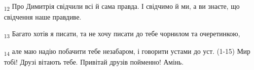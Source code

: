 \begin{tcolorbox}
\textsubscript{12} Про Димитрія свідчили всі й сама правда. І свідчимо й ми, а ви знаєте, що свідчення наше правдиве.
\end{tcolorbox}
\begin{tcolorbox}
\textsubscript{13} Багато хотів я писати, та не хочу писати до тебе чорнилом та очеретинкою,
\end{tcolorbox}
\begin{tcolorbox}
\textsubscript{14} але маю надію побачити тебе незабаром, і говорити устами до уст. (1-15) Мир тобі! Друзі вітають тебе. Привітай друзів пойменно! Амінь.
\end{tcolorbox}
